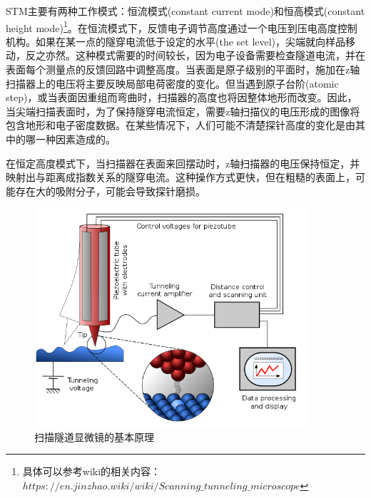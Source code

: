     STM主要有两种工作模式：恒流模式(constant current mode)和恒高模式(constant height mode)\footnote{具体可以参考wiki的相关内容：$https://en.jinzhao.wiki/wiki/Scanning\_tunneling\_microscope$}。在恒流模式下，反馈电子调节高度通过一个电压到压电高度控制机构。如果在某一点的隧穿电流低于设定的水平(the set level)，尖端就向样品移动，反之亦然。这种模式需要的时间较长，因为电子设备需要检查隧道电流，并在表面每个测量点的反馈回路中调整高度。当表面是原子级别的平面时，施加在z轴扫描器上的电压将主要反映局部电荷密度的变化。但当遇到原子台阶(atomic step)，或当表面因重组而弯曲时，扫描器的高度也将因整体地形而改变。因此，当尖端扫描表面时，为了保持隧穿电流恒定，需要z轴扫描仪的电压形成的图像将包含地形和电子密度数据。在某些情况下，人们可能不清楚探针高度的变化是由其中的哪一种因素造成的。
    
    在恒定高度模式下，当扫描器在表面来回摆动时，z轴扫描器的电压保持恒定，并映射出与距离成指数关系的隧穿电流。这种操作方式更快，但在粗糙的表面上，可能存在大的吸附分子，可能会导致探针磨损。
    \begin{figure}[H]
        \centering
        \includegraphics[width=0.9\textwidth]{figure/STM.png}
        \caption{扫描隧道显微镜的基本原理}
        \label{fig:STM}
    \end{figure}
